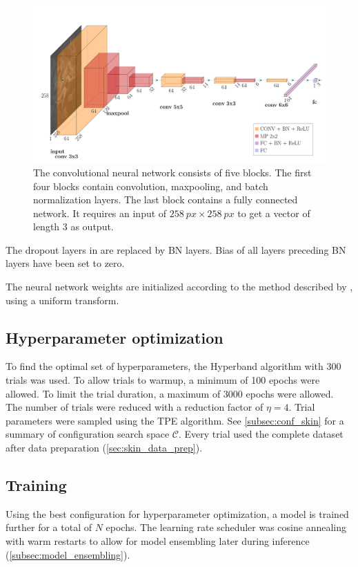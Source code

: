 \begin{figure}
  \includegraphics{skinstression/images/skinstression.pdf}
  \caption[Network architecture]{
    The convolutional neural network consists of five blocks.
    The first four blocks contain convolution, maxpooling, and batch normalization layers.
    The last block contains a fully connected network.
    It requires an input of $\qty{258}{px}\times\qty{258}{px}$ to get a vector of length 3 as output.
  }
  \label{fig:model}
\end{figure}

The dropout layers in \cite{Soylu2022} are replaced by BN layers.
Bias of all layers preceding BN layers have been set to zero.

The neural network weights are initialized according to the method described by \textcite{He2015a}, using a uniform transform.

\subsection{Hyperparameter optimization}
To find the optimal set of hyperparameters, the Hyperband algorithm with 300 trials was used.
To allow trials to warmup, a minimum of 100 epochs were allowed.
To limit the trial duration, a maximum of 3000 epochs were allowed.
The number of trials were reduced with a reduction factor of $\eta=4$.
Trial parameters were sampled using the TPE algorithm.
See \cref{subsec:conf_skin} for a summary of configuration search space $\mathcal{C}$.
Every trial used the complete dataset after data preparation (\cref{sec:skin_data_prep}).

\subsection{Training}
Using the best configuration for hyperparameter optimization, a model is trained further for a total of $N$ epochs.
The learning rate scheduler was cosine annealing with warm restarts to allow for model ensembling later during inference (\cref{subsec:model_ensembling}).

